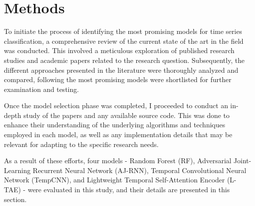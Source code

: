\chapter{Methods}
To initiate the process of identifying the most promising models for time series classification, a comprehensive review of the current state of the art in the field was conducted.
This involved a meticulous exploration of published research studies and academic papers related to the research question.
Subsequently, the different approaches presented in the literature were thoroughly analyzed and compared, following the most promising models were shortlisted for further examination and testing.

Once the model selection phase was completed, I proceeded to conduct an in-depth study of the papers and any available source code.
This was done to enhance their understanding of the underlying algorithms and techniques employed in each model, as well as any implementation details that may be relevant for adapting to the specific research needs.

As a result of these efforts, four models - Random Forest (RF), Adversarial Joint-Learning Recurrent Neural Network (AJ-RNN), Temporal Convolutional Neural Network (TempCNN), and Lightweight Temporal Self-Attention Encoder (L-TAE) - were evaluated in this study, and their details are presented in this section.





